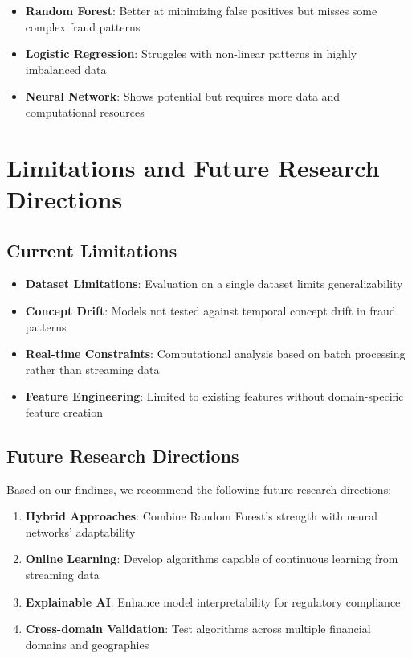 \begin{itemize}
\item \textbf{Random Forest}: Better at minimizing false positives but misses some complex fraud patterns
\item \textbf{Logistic Regression}: Struggles with non-linear patterns in highly imbalanced data
\item \textbf{Neural Network}: Shows potential but requires more data and computational resources
\end{itemize}

\section{Limitations and Future Research Directions}

\subsection{Current Limitations}

\begin{itemize}
\item \textbf{Dataset Limitations}: Evaluation on a single dataset limits generalizability
\item \textbf{Concept Drift}: Models not tested against temporal concept drift in fraud patterns
\item \textbf{Real-time Constraints}: Computational analysis based on batch processing rather than streaming data
\item \textbf{Feature Engineering}: Limited to existing features without domain-specific feature creation
\end{itemize}

\subsection{Future Research Directions}

Based on our findings, we recommend the following future research directions:

\begin{enumerate}
\item \textbf{Hybrid Approaches}: Combine Random Forest's strength with neural networks' adaptability
\item \textbf{Online Learning}: Develop algorithms capable of continuous learning from streaming data
\item \textbf{Explainable AI}: Enhance model interpretability for regulatory compliance
\item \textbf{Cross-domain Validation}: Test algorithms across multiple financial domains and geographies
\end{enumerate}

